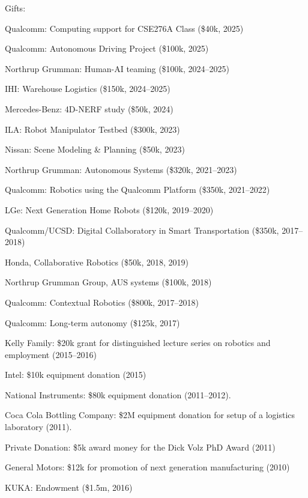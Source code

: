 \documentclass{article}
\begin{document}
\begin{cv}
	\begin{cvlist}{Gifts:}
	  \item Qualcomm: Computing support for CSE276A Class (\$40k, 2025)
	  \item Qualcomm: Autonomous Driving Project (\$100k, 2025) 
		\item Northrup Grumman: Human-AI teaming (\$100k, 2024--2025)
		\item IHI: Warehouse Logistics (\$150k, 2024--2025)
		\item Mercedes-Benz: 4D-NERF study (\$50k, 2024)
		\item ILA: Robot Manipulator Testbed (\$300k, 2023)
		\item Nissan: Scene Modeling \& Planning (\$50k, 2023)
		\item Northrup Grumman: Autonomous Systems (\$320k, 2021--2023)
		\item Qualcomm: Robotics using the Qualcomm Platform (\$350k, 2021--2022)
		\item LGe: Next Generation Home Robots (\$120k, 2019--2020)
		\item Qualcomm/UCSD: Digital Collaboratory in Smart Transportation
		(\$350k, 2017--2018)
		\item Honda, Collaborative Robotics (\$50k, 2018, 2019)
		\item Northrup Grumman Group, AUS systems (\$100k, 2018)
		\item Qualcomm: Contextual Robotics (\$800k, 2017--2018)
		\item Qualcomm: Long-term autonomy (\$125k, 2017)
		\item Kelly Family: \$20k grant for distinguished lecture series on
		robotics and employment (2015--2016)
		\item Intel: \$10k equipment donation (2015)
		\item National Instruments: \$80k equipment donation (2011--2012).
		\item Coca Cola Bottling Company: \$2M equipment donation for setup of
		a logistics laboratory (2011).
		\item Private Donation: \$5k award money for the Dick Volz PhD Award
		(2011)
		\item General Motors: \$12k for promotion of next generation
		manufacturing (2010)
		\item KUKA: Endowment (\$1.5m, 2016)
	\end{cvlist}


\end{cv}
\end{document}
